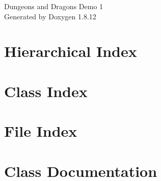 \documentclass[twoside]{book}
\newcommand{\+}{\discretionary{\mbox{\scriptsize$\hookleftarrow$}}{}{}}
\newcommand{\clearemptydoublepage}{%
  \newpage{\pagestyle{empty}\cleardoublepage}%
}
\begin{document}
\hypersetup{pageanchor=false,
             bookmarksnumbered=true,
             pdfencoding=unicode
            }
\begin{titlepage}
\vspace*{7cm}
\begin{center}%
{\Large Dungeons and Dragons Demo 1 }\\
\vspace*{1cm}
{\large Generated by Doxygen 1.8.12}\\
\end{center}
\end{titlepage}
\clearemptydoublepage
{}
\tableofcontents
\clearemptydoublepage
{}
\hypersetup{pageanchor=true}

\chapter{Hierarchical Index}

\chapter{Class Index}

\chapter{File Index}

\chapter{Class Documentation}
































\end{document}
